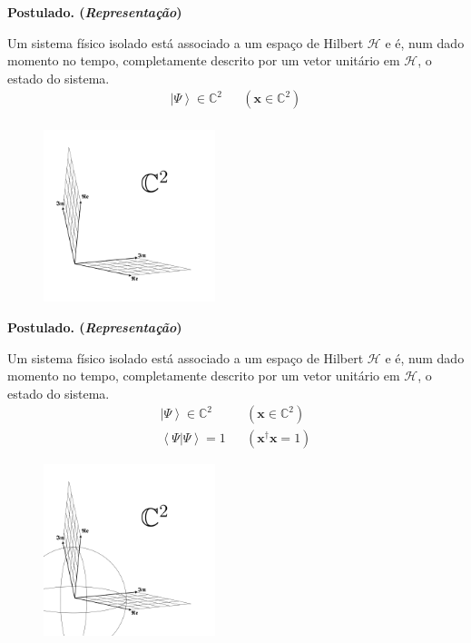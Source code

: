 \documentclass[t]{beamer}
\newcommand{\postulado}[1]{%
	\textbf{Postulado. (\emph{#1})\\}
}
\newcommand{\ket}[1]{\ensuremath{\left|#1\right\rangle}}
\newcommand{\braket}[2]{\ensuremath{\left\langle#1|#2\right\rangle}}
\begin{document}
	\begin{frame}{\subsecname}
		\postulado{Representação}
		Um sistema físico isolado está associado a um espaço de Hilbert $\mathcal{H}$ e é, num dado momento no tempo, completamente descrito por um vetor unitário em $\mathcal{H}$, o estado do sistema.		
		\begin{align*}
			\ket{\Psi} \in \mathbb{C}^2 && (\mathbf{x} \in \mathbb{C}^2)\\
		\end{align*}
		\vspace{-1cm} 
		\begin{figure}[H]
			\includegraphics[width=5cm]{c2.pdf}
		\end{figure}
	\end{frame}
	
	\begin{frame}{\subsecname}
		\postulado{Representação}
		Um sistema físico isolado está associado a um espaço de Hilbert $\mathcal{H}$ e é, num dado momento no tempo, completamente descrito por um vetor unitário em $\mathcal{H}$, o estado do sistema.		
		\begin{align*}
			\ket{\Psi} \in \mathbb{C}^2 && (\mathbf{x} \in \mathbb{C}^2)\\
			\braket{\Psi}{\Psi} = 1 && (\mathbf{x}^{\dagger} \mathbf{x} = 1)
		\end{align*}
		\vspace{-1cm}
		\begin{figure}[H]
			\includegraphics[width=5cm]{c2-sphere.pdf}
		\end{figure}
	\end{frame}
\end{document}
